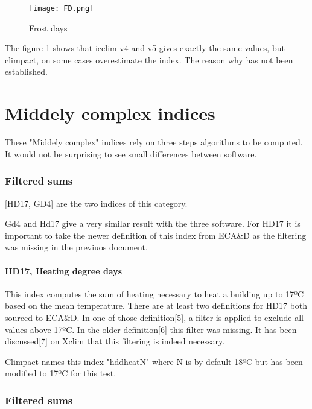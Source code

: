 \documentclass[a4paper,11pt]{article}
\begin{document}
    \begin{figure}[!hbt]
        \centering
        \texttt{[image: FD.png]}
        \caption{Frost days}
        \label{figure/fd}
    \end{figure}
    
    The figure \ref{figure/fd} shows that icclim v4 and v5 gives exactly the same values, but climpact, on some cases overestimate the index.
    The reason why has not been established.
    
\part{Middely complex indices}
    These "Middely complex" indices rely on three steps algorithms
    to be computed.
    It would not be surprising to see small differences between software.

\section{Filtered sums}
    [HD17, GD4] are the two indices of this category.

    Gd4 and Hd17 give a very similar result with the three software.
    For HD17 it is important to take the newer definition of this index from ECA&D as the filtering was missing in the previuos document.

\subsection{HD17, Heating degree days}
    This index computes the sum of heating necessary to heat a building up to 17ºC based on the mean temperature.
    There are at least two definitions for HD17 both sourced to ECA\&D.
    In one of those definition[5], a filter is applied to exclude all values above 17ºC. In the older definition[6] this filter was missing.
    It has been discussed[7] on Xclim that this filtering is indeed necessary.

    Climpact names this index "hddheatN" where N is by default 18ºC but has been modified to 17ºC for this test.

\section{Filtered sums}
\end{document}
